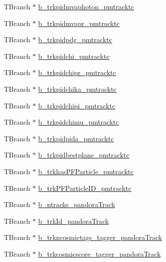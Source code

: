 \begin{DoxyCompactItemize}
\item 
T\-Branch $\ast$ \hyperlink{classanatree_a60e2be60803acd66f2c98d36c6337b0e}{b\-\_\-trkpidmvaphoton\-\_\-pmtracktc}
\item 
T\-Branch $\ast$ \hyperlink{classanatree_a08c13955d9f3ee78a9b0807727c51662}{b\-\_\-trkpidmvapr\-\_\-pmtracktc}
\item 
T\-Branch $\ast$ \hyperlink{classanatree_aab4d0917fbdeb44aa67a3ed45c6d32a5}{b\-\_\-trkpidpdg\-\_\-pmtracktc}
\item 
T\-Branch $\ast$ \hyperlink{classanatree_a8383a335092e34cd60fab8e4975395ab}{b\-\_\-trkpidchi\-\_\-pmtracktc}
\item 
T\-Branch $\ast$ \hyperlink{classanatree_ab6633c32388a18dbdac59556ec347de5}{b\-\_\-trkpidchipr\-\_\-pmtracktc}
\item 
T\-Branch $\ast$ \hyperlink{classanatree_a18677f6b18fe8f56a7063e0d81a3868b}{b\-\_\-trkpidchika\-\_\-pmtracktc}
\item 
T\-Branch $\ast$ \hyperlink{classanatree_a57b16de772a0921e339a34aa1a1edeec}{b\-\_\-trkpidchipi\-\_\-pmtracktc}
\item 
T\-Branch $\ast$ \hyperlink{classanatree_a6d2b95af5233718b6e82fb202a7c1d6c}{b\-\_\-trkpidchimu\-\_\-pmtracktc}
\item 
T\-Branch $\ast$ \hyperlink{classanatree_add485a3f544e901cf5edb8df81e9563e}{b\-\_\-trkpidpida\-\_\-pmtracktc}
\item 
T\-Branch $\ast$ \hyperlink{classanatree_a23e630df898cfb515d8d4064377bdb36}{b\-\_\-trkpidbestplane\-\_\-pmtracktc}
\item 
T\-Branch $\ast$ \hyperlink{classanatree_a45ab227987467c729806898d0ed23a5f}{b\-\_\-trkhas\-P\-F\-Particle\-\_\-pmtracktc}
\item 
T\-Branch $\ast$ \hyperlink{classanatree_aa2272aed6f8daf4970c8b10839373021}{b\-\_\-trk\-P\-F\-Particle\-I\-D\-\_\-pmtracktc}
\item 
T\-Branch $\ast$ \hyperlink{classanatree_a3fe1408a4b38ef9ccce5cb055e4ef1a6}{b\-\_\-ntracks\-\_\-pandora\-Track}
\item 
T\-Branch $\ast$ \hyperlink{classanatree_a032199668b40171279c6d42655ae8692}{b\-\_\-trk\-Id\-\_\-pandora\-Track}
\item 
T\-Branch $\ast$ \hyperlink{classanatree_a49f812bf3a93903d7b6101d93180fa94}{b\-\_\-trkncosmictags\-\_\-tagger\-\_\-pandora\-Track}
\item 
T\-Branch $\ast$ \hyperlink{classanatree_a1ad8e0ae9b7214697bb471609cc4af0b}{b\-\_\-trkcosmicscore\-\_\-tagger\-\_\-pandora\-Track}
\item 

\end{DoxyCompactItemize}
